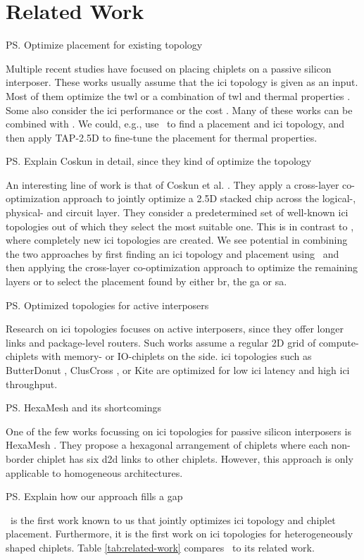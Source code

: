 \section{Related Work}
\label{sec:related-work}

\ps{Optimize placement for existing topology}

Multiple recent studies have focused on placing chiplets on a passive silicon interposer.
These works usually assume that the \gls{ici} topology is given as an input.
Most of them optimize the \gls{twl} \cite{ho, liu, seemuth, osmolovskyi} or a combination of \gls{twl} and thermal properties \cite{chiou, tap25d}.
Some also consider the \gls{ici} performance or the cost \cite{eris}.
Many of these works can be combined with \name. 
We could, e.g., use \name~to find a placement and \gls{ici} topology, and then apply TAP-2.5D \cite{tap25d} to fine-tune the placement for thermal properties. 

\ps{Explain Coskun in detail, since they kind of optimize the topology}

An interesting line of work is that of Coskun et al. \cite{coskun-1, coskun-2}.
They apply a cross-layer co-optimization approach to jointly optimize a 2.5D stacked chip across the logical-, physical- and circuit layer.
They consider a predetermined set of well-known \gls{ici} topologies out of which they select the most suitable one.
This is in contrast to \name, where completely new \gls{ici} topologies are created.
We see potential in combining the two approaches by first finding an \gls{ici} topology and placement using \name~and then applying the cross-layer co-optimization approach to optimize the remaining layers or to select the placement found by either \gls{br}, the \gls{ga} or \gls{sa}.

\ps{Optimized topologies for active interposers}

Research on \gls{ici} topologies focuses on active interposers, since they offer longer links and package-level routers.
Such works assume a regular 2D grid of compute-chiplets with memory- or IO-chiplets on the side.
\gls{ici} topologies such as ButterDonut \cite{butterdonut}, ClusCross \cite{cluscross}, or Kite \cite{kite} are optimized for low \gls{ici} latency and high \gls{ici} throughput.

\ps{HexaMesh and its shortcomings}

One of the few works focussing on \gls{ici} topologies for passive silicon interposers is HexaMesh \cite{hexamesh}.
They propose a hexagonal arrangement of chiplets where each non-border chiplet has six \gls{d2d} links to other chiplets.
However, this approach is only applicable to homogeneous architectures.

\ps{Explain how our approach fills a gap}

\name~is the first work known to us that jointly optimizes \gls{ici} topology and chiplet placement.
Furthermore, it is the first work on \gls{ici} topologies for heterogeneously shaped chiplets.
Table \ref{tab:related-work} compares \name~to its related work.




